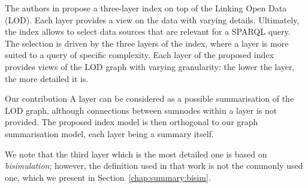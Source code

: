 The authors in \cite{konrath:jws:2012} propose a three-layer index on top of the Linking Open Data (LOD). Each layer provides a view on the data with varying details. Ultimately, the index allows to select data sources that are relevant for a SPARQL query. The selection is driven by the three layers of the index, where a layer is more suited to a query of specific complexity.
Each layer of the proposed index provides views of the LOD graph with varying granularity: the lower the layer, the more detailed it is.

\begin{centeremph}{Our contribution}
	A layer can be considered as a possible summarisation of the LOD graph, although connections between sumnodes within a layer is not provided. The proposed index model is then orthogonal to our graph summarisation model, each layer being a summary itself.

	We note that the third layer which is the most detailed one is based on \emph{bisimulation}; however, the definition used in that work is not the commonly used one, which we present in Section~\ref{chap:summary:bisim}.
\end{centeremph}





